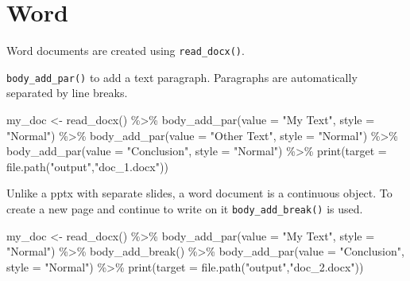 \documentclass[
]{book}
\newenvironment{Shaded}{\begin{snugshade}}{\end{snugshade}}
\newcommand{\AttributeTok}[1]{\textcolor[rgb]{0.77,0.63,0.00}{#1}}
\newcommand{\FunctionTok}[1]{\textcolor[rgb]{0.00,0.00,0.00}{#1}}
\newcommand{\NormalTok}[1]{#1}
\newcommand{\OtherTok}[1]{\textcolor[rgb]{0.56,0.35,0.01}{#1}}
\newcommand{\SpecialCharTok}[1]{\textcolor[rgb]{0.00,0.00,0.00}{#1}}
\newcommand{\StringTok}[1]{\textcolor[rgb]{0.31,0.60,0.02}{#1}}
\begin{document}
\hypertarget{word}{%
\section{Word}\label{word}}

Word documents are created using \texttt{read\_docx()}.

\texttt{body\_add\_par()} to add a text paragraph. Paragraphs are automatically separated by line breaks.

\begin{Shaded}
\begin{Highlighting}[]
\NormalTok{my\_doc }\OtherTok{\textless{}{-}} \FunctionTok{read\_docx}\NormalTok{() }\SpecialCharTok{\%\textgreater{}\%} 
  \FunctionTok{body\_add\_par}\NormalTok{(}\AttributeTok{value =} \StringTok{"My Text"}\NormalTok{, }\AttributeTok{style =} \StringTok{"Normal"}\NormalTok{) }\SpecialCharTok{\%\textgreater{}\%}
  \FunctionTok{body\_add\_par}\NormalTok{(}\AttributeTok{value =} \StringTok{"Other Text"}\NormalTok{, }\AttributeTok{style =} \StringTok{"Normal"}\NormalTok{) }\SpecialCharTok{\%\textgreater{}\%} 
  \FunctionTok{body\_add\_par}\NormalTok{(}\AttributeTok{value =} \StringTok{"Conclusion"}\NormalTok{, }\AttributeTok{style =} \StringTok{"Normal"}\NormalTok{) }\SpecialCharTok{\%\textgreater{}\%} 
  \FunctionTok{print}\NormalTok{(}\AttributeTok{target =} \FunctionTok{file.path}\NormalTok{(}\StringTok{"output"}\NormalTok{,}\StringTok{"doc\_1.docx"}\NormalTok{))}
\end{Highlighting}
\end{Shaded}

Unlike a pptx with separate slides, a word document is a continuous object. To create a new page and continue to write on it \texttt{body\_add\_break()} is used.

\begin{Shaded}
\begin{Highlighting}[]
\NormalTok{my\_doc }\OtherTok{\textless{}{-}} \FunctionTok{read\_docx}\NormalTok{() }\SpecialCharTok{\%\textgreater{}\%} 
  \FunctionTok{body\_add\_par}\NormalTok{(}\AttributeTok{value =} \StringTok{"My Text"}\NormalTok{, }\AttributeTok{style =} \StringTok{"Normal"}\NormalTok{) }\SpecialCharTok{\%\textgreater{}\%}
  \FunctionTok{body\_add\_break}\NormalTok{() }\SpecialCharTok{\%\textgreater{}\%} 
  \FunctionTok{body\_add\_par}\NormalTok{(}\AttributeTok{value =} \StringTok{"Conclusion"}\NormalTok{, }\AttributeTok{style =} \StringTok{"Normal"}\NormalTok{) }\SpecialCharTok{\%\textgreater{}\%} 
  \FunctionTok{print}\NormalTok{(}\AttributeTok{target =} \FunctionTok{file.path}\NormalTok{(}\StringTok{"output"}\NormalTok{,}\StringTok{"doc\_2.docx"}\NormalTok{))}
\end{Highlighting}
\end{Shaded}
\end{document}
